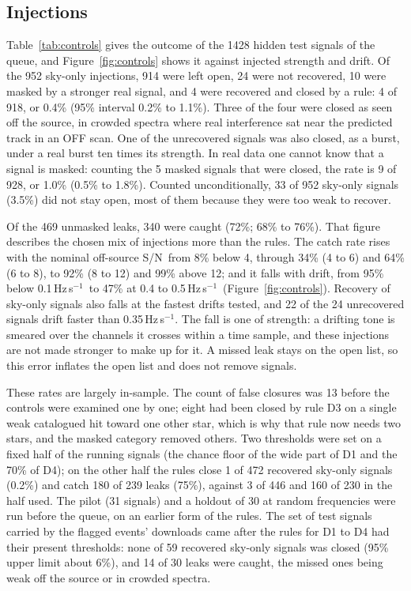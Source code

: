 \documentclass[twocolumn]{aastex631}
\newcommand{\hzs}{Hz\,s$^{-1}$}
\newcommand{\sn}{S/N}
\begin{document}
\subsection{Injections}

Table~\ref{tab:controls} gives the outcome of the 1428 hidden test signals
of the queue, and Figure~\ref{fig:controls} shows it against injected
strength and drift. Of the 952 sky-only injections, 914 were left open, 24
were not recovered, 10 were masked by a stronger real signal, and 4 were
recovered and closed by a rule: 4 of 918, or 0.4\% (95\% interval 0.2\% to
1.1\%). Three of the four were closed as seen off the source, in crowded
spectra where real interference sat near the predicted track in an OFF
scan. One of the unrecovered signals was also closed, as a burst, under a
real burst ten times its strength. In real data one cannot know that a
signal is masked: counting the 5 masked signals that were closed, the rate
is 9 of 928, or 1.0\% (0.5\% to 1.8\%). Counted unconditionally, 33 of 952
sky-only signals (3.5\%) did not stay open, most of them because they were
too weak to recover.

Of the 469 unmasked leaks, 340 were caught (72\%; 68\% to 76\%). That
figure describes the chosen mix of injections more than the rules. The
catch rate rises with the nominal off-source \sn\ from 8\% below 4, through
34\% (4 to 6) and 64\% (6 to 8), to 92\% (8 to 12) and 99\% above 12; and
it falls with drift, from 95\% below 0.1\,\hzs\ to 47\% at 0.4 to
0.5\,\hzs\ (Figure~\ref{fig:controls}). Recovery of sky-only signals also
falls at the fastest drifts tested, and 22 of the 24 unrecovered signals
drift faster than 0.35\,\hzs. The fall is one of strength: a drifting tone
is smeared over the channels it crosses within a time sample, and these
injections are not made stronger to make up for it. A missed leak stays on
the open list, so this error inflates the open list and does not remove
signals.

These rates are largely in-sample. The count of false closures was 13
before the controls were examined one by one; eight had been closed by rule
D3 on a single weak catalogued hit toward one other star, which is why that
rule now needs two stars, and the masked category removed others. Two
thresholds were set on a fixed half of the running signals (the chance floor
of the wide part of D1 and the 70\% of D4); on the other half the rules
close 1 of 472 recovered sky-only signals (0.2\%) and catch 180 of 239 leaks
(75\%), against 3 of 446 and 160 of 230 in the half used. The pilot (31
signals) and a holdout of 30 at random frequencies were run before the
queue, on an earlier form of the rules. The set of test signals carried by
the flagged events' downloads came after the rules for D1 to D4 had their
present thresholds: none of 59 recovered sky-only signals was closed (95\%
upper limit about 6\%), and 14 of 30 leaks were caught, the missed ones
being weak off the source or in crowded spectra.
\end{document}
